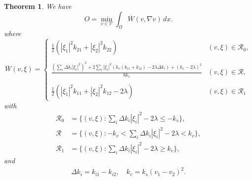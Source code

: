 \documentclass[11pt]{article}
\newtheorem{theorem}{Theorem}[section]
\begin{document}
 \begin{theorem}
 We have
 $$
 O = \min_{v\in\mathcal{V}} \int_\Omega \overline{W}(v,\nabla v)\,dx.
 $$
 where 
%
$$
\overline{W}(v,\xi) = \begin{cases}
\frac{1}{2} \left(|\xi_1|^2 k_{21}+|\xi_2|^2 k_{22} \right)
& (v,\xi) \in {\mathcal R}_0,
\\ \\
\displaystyle{
\frac{ \left(\sum_i \Delta k_i |\xi_i|^2\right)^2 
+2 \sum_i |\xi_i|^2 (k_v(k_{i1}+k_{i2}) -  2\lambda \Delta k_i)
+ (k_v - 2 \lambda)^2}{8k_v}}  & (v,\xi) \in {\mathcal R},
\\ \\
\frac{1}{2} \left(|\xi_1|^2 k_{11}+|\xi_2|^2 k_{12}-2 \lambda \right) 
& (v,\xi) \in {\mathcal R}_1
\end{cases} 
$$
with
\begin{align*}
{\mathcal R}_0 &= \{ (v,\xi): \sum_i \Delta k_i |\xi_i|^2 - 2\lambda \leq -k_v \},  \\
{\mathcal R} &= \{ (v,\xi): -k_v < \sum_i \Delta k_i |\xi_i|^2 - 2\lambda < k_v \}, \\
{\mathcal R}_1 &= \{ (v,\xi): \sum_i \Delta k_i |\xi_i|^2 - 2\lambda \geq k_v \},
\end{align*}
and 
\begin{align*}
\Delta k_i = k_{i1} - k_{i2} , \quad
k_v = k_s(v_1-v_2)^2.
\end{align*}

\end{theorem}
\end{document}
